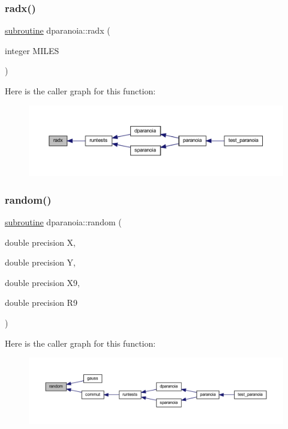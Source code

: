 \subsubsection{\texorpdfstring{radx()}{radx()}}
{\footnotesize\ttfamily \hyperlink{M__stopwatch_83_8txt_acfbcff50169d691ff02d4a123ed70482}{subroutine} dparanoia\+::radx (\begin{DoxyParamCaption}\item[{integer}]{M\+I\+L\+ES }\end{DoxyParamCaption})}

Here is the caller graph for this function\+:
\nopagebreak
\begin{figure}[H]
\begin{center}
\leavevmode
\includegraphics[width=350pt]{dparanoia_8f90_ae90ce15b8c2d18156d500ae21387764d_icgraph}
\end{center}
\end{figure}
\mbox{\label{dparanoia_8f90_ad92575b76d7d716ba86718803093a1dc}} 
\subsubsection{\texorpdfstring{random()}{random()}}
{\footnotesize\ttfamily \hyperlink{M__stopwatch_83_8txt_acfbcff50169d691ff02d4a123ed70482}{subroutine} dparanoia\+::random (\begin{DoxyParamCaption}\item[{double precision}]{X,  }\item[{double precision}]{Y,  }\item[{double precision}]{X9,  }\item[{double precision}]{R9 }\end{DoxyParamCaption})}

Here is the caller graph for this function\+:
\nopagebreak
\begin{figure}[H]
\begin{center}
\leavevmode
\includegraphics[width=350pt]{dparanoia_8f90_ad92575b76d7d716ba86718803093a1dc_icgraph}
\end{center}
\end{figure}
\mbox{\label{dparanoia_8f90_ac9fa3597b76a0e3e3622dee7db0246cd}} 
